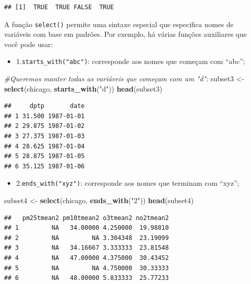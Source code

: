 \documentclass[a4paper]{book}
\newenvironment{Shaded}{\begin{snugshade}}{\end{snugshade}}
\newcommand{\CommentTok}[1]{\textcolor[rgb]{0.56,0.35,0.01}{\textit{#1}}}
\newcommand{\KeywordTok}[1]{\textcolor[rgb]{0.13,0.29,0.53}{\textbf{#1}}}
\newcommand{\NormalTok}[1]{#1}
\newcommand{\StringTok}[1]{\textcolor[rgb]{0.31,0.60,0.02}{#1}}
\providecommand{\tightlist}{%
  \setlength{\itemsep}{0pt}\setlength{\parskip}{0pt}}
\begin{document}
\begin{verbatim}
## [1]  TRUE  TRUE FALSE  TRUE
\end{verbatim}

A função \texttt{select()} permite uma sintaxe especial que especifica nomes de variáveis com base em padrões. Por exemplo, há várias funções auxiliares que você pode usar:

\begin{itemize}
\tightlist
\item
  1.\texttt{starts\_with("abc")}: corresponde aos nomes que começam com ``abc'';
\end{itemize}

\begin{Shaded}
\begin{Highlighting}[]
\CommentTok{#Queremos manter todas as variáveis que começam com um "d":}
\NormalTok{subset3 <-}\StringTok{ }\KeywordTok{select}\NormalTok{(chicago, }\KeywordTok{starts_with}\NormalTok{(}\StringTok{"d"}\NormalTok{))}
\KeywordTok{head}\NormalTok{(subset3)}
\end{Highlighting}
\end{Shaded}

\begin{verbatim}
##     dptp       date
## 1 31.500 1987-01-01
## 2 29.875 1987-01-02
## 3 27.375 1987-01-03
## 4 28.625 1987-01-04
## 5 28.875 1987-01-05
## 6 35.125 1987-01-06
\end{verbatim}

\begin{itemize}
\tightlist
\item
  2.\texttt{ends\_with("xyz")}: corresponde aos nomes que terminam com ``xyz'';
\end{itemize}

\begin{Shaded}
\begin{Highlighting}[]
\NormalTok{subset4 <-}\StringTok{ }\KeywordTok{select}\NormalTok{(chicago, }\KeywordTok{ends_with}\NormalTok{(}\StringTok{"2"}\NormalTok{))}
\KeywordTok{head}\NormalTok{(subset4)}
\end{Highlighting}
\end{Shaded}

\begin{verbatim}
##   pm25tmean2 pm10tmean2 o3tmean2 no2tmean2
## 1         NA   34.00000 4.250000  19.98810
## 2         NA         NA 3.304348  23.19099
## 3         NA   34.16667 3.333333  23.81548
## 4         NA   47.00000 4.375000  30.43452
## 5         NA         NA 4.750000  30.33333
## 6         NA   48.00000 5.833333  25.77233
\end{verbatim}
\end{document}
